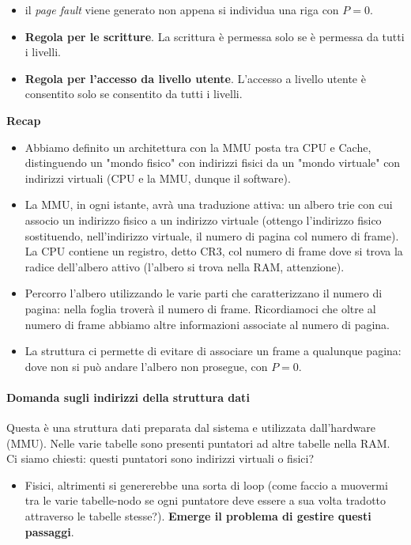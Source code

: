 \begin{itemize}
	\item il \emph{page fault} viene generato non appena si individua una riga con $P=0$.
	\item \textbf{Regola per le scritture}. La scrittura è permessa solo se è permessa da tutti i livelli.
	\item \textbf{Regola per l'accesso da livello utente}. L'accesso a livello utente è consentito solo se consentito da tutti i livelli.
\end{itemize}
\begin{framed}
	\noindent \textbf{Recap}
	\begin{itemize}
		\item Abbiamo definito un architettura con la MMU posta tra CPU e Cache, distinguendo un "mondo fisico" con indirizzi fisici da un "mondo virtuale" con indirizzi virtuali (CPU e la MMU, dunque il software).
		\item La MMU, in ogni istante, avrà una traduzione attiva: un albero trie con cui associo un indirizzo fisico a un indirizzo virtuale (ottengo l'indirizzo fisico sostituendo, nell'indirizzo virtuale, il numero di pagina col numero di frame). La CPU contiene un registro, detto CR3, col numero di frame dove si trova la radice dell'albero attivo (l'albero si trova nella RAM, attenzione).
		\item Percorro l'albero utilizzando le varie parti che caratterizzano il numero di pagina: nella foglia troverà il numero di frame. Ricordiamoci che oltre al numero di frame abbiamo altre informazioni associate al numero di pagina.
		\item La struttura ci permette di evitare di associare un frame a qualunque pagina: dove non si può andare l'albero non prosegue, con $P=0$.
	\end{itemize}   
\end{framed}
\paragraph{Domanda sugli indirizzi della struttura dati} Questa è una struttura dati preparata dal sistema e utilizzata dall'hardware (MMU). Nelle varie tabelle sono presenti puntatori ad altre tabelle nella RAM. Ci siamo chiesti: questi puntatori sono indirizzi virtuali o fisici? 
\begin{itemize}
	\item Fisici, altrimenti si genererebbe una sorta di loop (come faccio a muovermi tra le varie tabelle-nodo se ogni puntatore deve essere a sua volta tradotto attraverso le tabelle stesse?). \textbf{Emerge il problema di gestire questi passaggi}.
\end{itemize}

